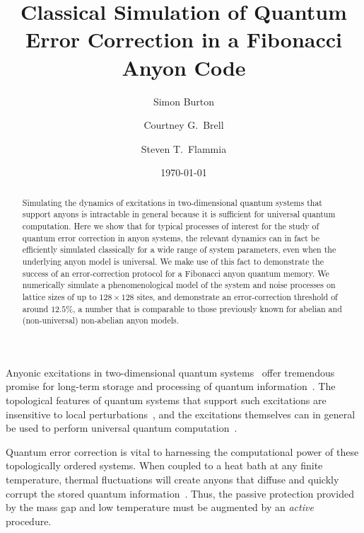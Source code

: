 \documentclass[aps, prl, letterpaper, twocolumn, superscriptaddress, notitlepage]{revtex4-1}
\begin{document}
\title{Classical Simulation of Quantum Error Correction in a Fibonacci Anyon Code}

\author{Simon Burton}
\author{Courtney G.\ Brell}
\author{Steven T.\ Flammia}

\date{\today}

\begin{abstract}
Simulating the dynamics of excitations in two-dimensional quantum systems that support 
anyons is intractable in general because it is sufficient for universal quantum computation. 
Here we show that for typical processes of interest for the study of quantum error correction 
in anyon systems, the relevant dynamics can in fact be efficiently simulated classically for a 
wide range of system parameters, even when the underlying anyon model is universal. We 
make use of this fact to demonstrate the success of an error-correction protocol for a 
Fibonacci anyon quantum memory. We numerically simulate a phenomenological model of 
the system and noise processes on lattice sizes of up to $128\times128$ sites, and 
demonstrate an error-correction threshold of around $12.5\%$, a number that is comparable 
to those previously known for abelian and (non-universal) non-abelian anyon models.
\end{abstract}

\maketitle


Anyonic excitations in two-dimensional quantum systems~\cite{Wilczek1990} offer tremendous promise for long-term storage and processing of quantum information~\cite{Kitaev2003}. The topological features of quantum systems that support such excitations are insensitive to local perturbations~\cite{Bravyi2010, *Bravyi2011a, *Michalakis2013}, and the excitations themselves can in general be used to perform universal quantum computation~\cite{Freedman2002, *Freedman2002b}. 

Quantum error correction is vital to harnessing the computational power of these topologically ordered systems. When coupled to a heat bath at any finite temperature, thermal fluctuations will create anyons that diffuse and quickly corrupt the stored quantum information~\cite{Pastawski2010}. Thus, the passive protection provided by the mass gap and low temperature must be augmented by an \emph{active} procedure. 
\end{document}
